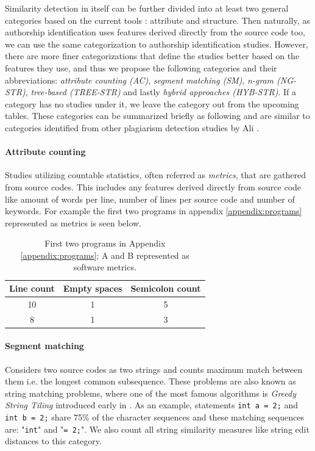 Similarity detection in itself can be further divided into at least two general categories based on the current tools \cite{RSCAD2016}: attribute and structure. Then naturally, as authorship identification uses features derived directly from the source code too, we can use the same categorization to authorship identification studies. However, there are more finer categorizations that define the studies better based on the features they use, and thus we propose the following categories and their abbreviations: \emph{attribute counting (AC)}, \emph{segment matching (SM)}, \emph{n-gram (NG-STR)}, \emph{tree-based (TREE-STR)} and lastly \emph{hybrid approaches (HYB-STR)}. If a category has no studies under it, we leave the category out from the upcoming tables. These categories can be summarized briefly as following and are similar to categories identified from other plagiarism detection studies by Ali \etal \cite{OCPOCP2011}. 

\paragraph{Attribute counting}
Studies utilizing countable statistics, often referred as \emph{metrics}, that are gathered from source codes. This includes any features derived directly from source code like amount of words per line, number of lines per source code and number of keywords. For example the first two programs in appendix \ref{appendix:programs} represented as metrics is seen below.

\begin{table}[ht]
    \centering
    \begin{tabular}{|c|c|c|} \hline
        \textbf{Line count} & \textbf{Empty spaces} & \textbf{Semicolon count}\\ \hline
         10 & 1 & 5 \\ \hline
         8 & 1 & 3\\ \hline
    \end{tabular}
    \caption{First two programs in Appendix \ref{appendix:programs}; A and B represented as software metrics.}
    \label{tab:my_label}
\end{table}

\paragraph{Segment matching}
Considers two source codes as two strings and counts maximum match between them i.e. the longest common subsequence. These problems are also known as string matching problems, where one of the most famous algorithms is \emph{Greedy String Tiling} introduced early in \cite{SSGST1993}. As an example, statements \texttt{int a = 2;} and \texttt{int b = 2;} share 75\% of the character sequences and these matching sequences are: "\texttt{int}" and "\texttt{= 2;}". We also count all string similarity measures like string edit distances  to this category.

